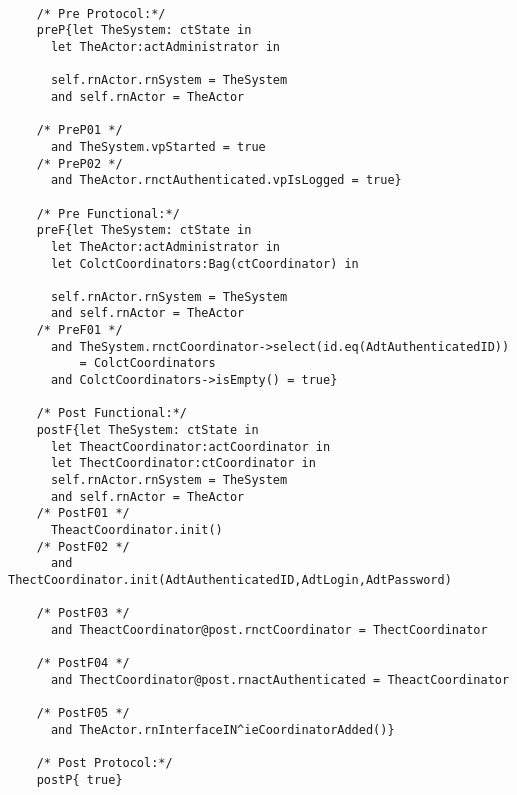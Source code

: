 	\scriptsize
	\vspace{0.5cm}
	\begin{lstlisting}[style=MessirStyle,firstnumber=auto,captionpos=b,caption={\msrmessir (MCL-oriented) specification of the operation \emph{oeAddCoordinator}.},label=OM-actAdministrator-oeAddCoordinator-MCL-LST]

	/* Pre Protocol:*/ 
	preP{let TheSystem: ctState in
	  let TheActor:actAdministrator in
	  
	  self.rnActor.rnSystem = TheSystem
	  and self.rnActor = TheActor
	  
	/* PreP01 */
	  and TheSystem.vpStarted = true
	/* PreP02 */
	  and TheActor.rnctAuthenticated.vpIsLogged = true}
	
	/* Pre Functional:*/
	preF{let TheSystem: ctState in
	  let TheActor:actAdministrator in
	  let ColctCoordinators:Bag(ctCoordinator) in
	  
	  self.rnActor.rnSystem = TheSystem
	  and self.rnActor = TheActor
	/* PreF01 */
	  and TheSystem.rnctCoordinator->select(id.eq(AdtAuthenticatedID))
	      = ColctCoordinators
	  and ColctCoordinators->isEmpty() = true}
	
	/* Post Functional:*/ 
	postF{let TheSystem: ctState in
	  let TheactCoordinator:actCoordinator in
	  let ThectCoordinator:ctCoordinator in
	  self.rnActor.rnSystem = TheSystem
	  and self.rnActor = TheActor
	/* PostF01 */
	  TheactCoordinator.init()
	/* PostF02 */
	  and ThectCoordinator.init(AdtAuthenticatedID,AdtLogin,AdtPassword)
	
	/* PostF03 */
	  and TheactCoordinator@post.rnctCoordinator = ThectCoordinator
	  
	/* PostF04 */  
	  and ThectCoordinator@post.rnactAuthenticated = TheactCoordinator
	   
	/* PostF05 */  
	  and TheActor.rnInterfaceIN^ieCoordinatorAdded()}
	
	/* Post Protocol:*/ 
	postP{ true}
	
	\end{lstlisting}
	\normalsize 
	
	
	
	





